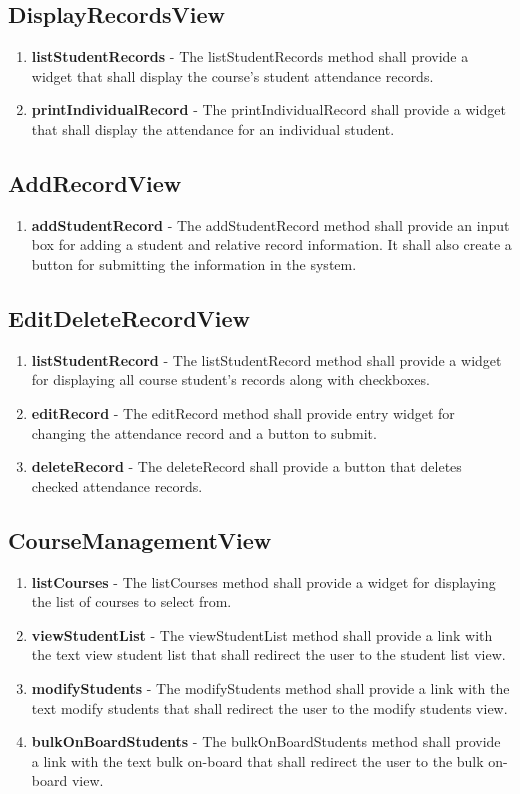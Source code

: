 \documentclass[letterpaper,12pt,oneside,listof=totoc]{scrreprt}
\begin{document}
\subsection{DisplayRecordsView}
\begin{enumerate}
    \item \textbf{listStudentRecords} - The listStudentRecords method shall provide a widget that shall display the course's student attendance records.
    \item \textbf{printIndividualRecord} - The printIndividualRecord shall provide a widget that shall display the attendance for an individual student.
\end{enumerate}

\subsection{AddRecordView}
\begin{enumerate}
    \item \textbf{addStudentRecord} - The addStudentRecord method shall provide an input box for adding a student and relative record information. It shall also create a button for submitting the information in the system.
\end{enumerate}

\subsection{EditDeleteRecordView}
\begin{enumerate}
    \item \textbf{listStudentRecord} - The listStudentRecord method shall provide a widget for displaying all course student's records along with checkboxes.
    \item \textbf{editRecord} - The editRecord method shall provide entry widget for changing the attendance record and a button to submit.
    \item \textbf{deleteRecord} - The deleteRecord shall provide a button that deletes checked attendance records.
\end{enumerate}

\subsection{CourseManagementView}
\begin{enumerate}
    \item \textbf{listCourses} - The listCourses method shall provide a widget for displaying the list of courses to select from.
    \item \textbf{viewStudentList} - The viewStudentList method shall provide a link with the text view student list that shall redirect the user to the student list view.
    \item \textbf{modifyStudents} - The modifyStudents method shall provide a link with the text modify students that shall redirect the user to the modify students view.
    \item \textbf{bulkOnBoardStudents} - The bulkOnBoardStudents method shall provide a link with the text bulk on-board that shall redirect the user to the bulk on-board view.
\end{enumerate}
\end{document}
